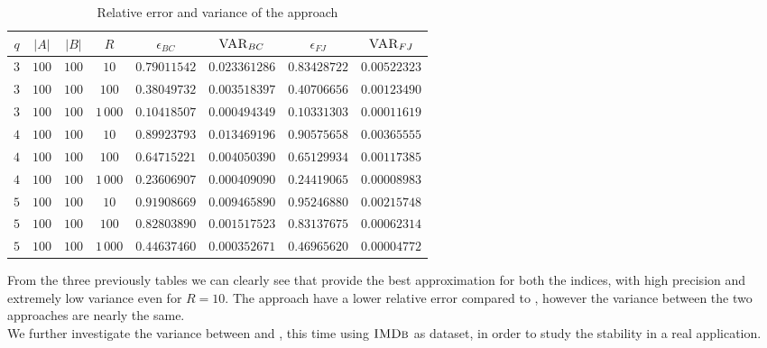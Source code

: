 \begin{table}[h]
	\centering
	\label{my-label}
	\begin{tabular}{|c|c|c|c|c|c|c|c|}
		\hline
		$q$ & $|A|$ & $|B|$ & $R$      & $\epsilon_{BC}$ & $\textsc{VAR}_{BC}$ & $\epsilon_{FJ}$ & $\textsc{VAR}_{FJ}$ \\ \hline \hline
		$3$ & $100$ & $100$ & $10$     & $0.79011542$ & $0.023361286$ & $0.83428722$ & $0.00522323$ \\ \hline
		$3$ & $100$ & $100$ & $100$    & $0.38049732$ & $0.003518397$ & $0.40706656$ & $0.00123490$ \\ \hline
		$3$ & $100$ & $100$ & $1\,000$ & $0.10418507$ & $0.000494349$ & $0.10331303$ & $0.00011619$ \\ \hline \hline
		$4$ & $100$ & $100$ & $10$     & $0.89923793$ & $0.013469196$ & $0.90575658$ & $0.00365555$ \\ \hline
		$4$ & $100$ & $100$ & $100$    & $0.64715221$ & $0.004050390$ & $0.65129934$ & $0.00117385$ \\ \hline
		$4$ & $100$ & $100$ & $1\,000$ & $0.23606907$ & $0.000409090$ & $0.24419065$ & $0.00008983$ \\ \hline \hline
		$5$ & $100$ & $100$ & $10$     & $0.91908669$ & $0.009465890$ & $0.95246880$ & $0.00215748$ \\ \hline
		$5$ & $100$ & $100$ & $100$    & $0.82803890$ & $0.001517523$ & $0.83137675$ & $0.00062314$ \\ \hline
		$5$ & $100$ & $100$ & $1\,000$ & $0.44637460$ & $0.000352671$ & $0.46965620$ & $0.00004772$ \\ \hline
	\end{tabular}
	\caption{Relative error and variance of the \base approach}	
\end{table}
		
		\clearpage
		
		From the three previously tables we can clearly see that \fcount provide the best approximation for both the indices, 
		with high precision and extremely low variance even for $R=10$. 
		The \fsamp approach have a lower relative error compared to \base, however the variance between the two approaches are nearly the same.\\ 
		
		We further investigate the variance between \fsamp and \base, this time using $\textsc{IMDb}$ as dataset,
		in order to study the stability in a real application.
				
